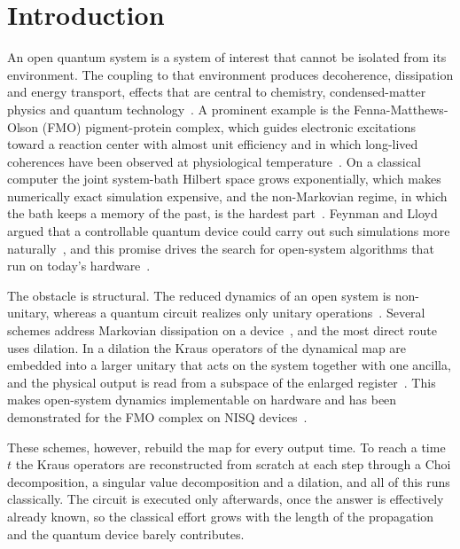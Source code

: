 \documentclass[aps,pra,twocolumn,superscriptaddress,nofootinbib,longbibliography]{revtex4-2}
\begin{document}
\maketitle

\section{Introduction}
\label{sec:intro}
An open quantum system is a system of interest that cannot be isolated from its
environment. The coupling to that environment produces decoherence, dissipation
and energy transport, effects that are central to chemistry, condensed-matter
physics and quantum technology~\cite{breuer2002}. A prominent example is the
Fenna-Matthews-Olson (FMO) pigment-protein complex, which guides electronic
excitations toward a reaction center with almost unit efficiency and in which
long-lived coherences have been observed at physiological
temperature~\cite{fenna1975,engel2007,ishizaki2009,adolphs2006}. On a classical
computer the joint system-bath Hilbert space grows exponentially, which makes
numerically exact simulation expensive, and the non-Markovian regime, in which
the bath keeps a memory of the past, is the hardest part~\cite{seneviratne2024}.
Feynman and Lloyd argued that a controllable quantum device could carry out such
simulations more naturally~\cite{feynman1982,lloyd1996}, and this promise drives
the search for open-system algorithms that run on today's
hardware~\cite{preskill2018}.

The obstacle is structural. The reduced dynamics of an open system is
non-unitary, whereas a quantum circuit realizes only unitary
operations~\cite{nielsen2010}. Several schemes address Markovian dissipation on
a device~\cite{sweke2015,kliesch2011,cleve2017,schlimgen2021}, and the most
direct route uses dilation. In a dilation the Kraus operators of the dynamical
map are embedded into a larger unitary that acts on the system together with one
ancilla, and the physical output is read from a subspace of the enlarged
register~\cite{hu2022,seneviratne2024}. This makes open-system dynamics
implementable on hardware and has been demonstrated for the FMO complex on NISQ
devices~\cite{hu2022,seneviratne2024,headmarsden2021}.

These schemes, however, rebuild the map for every output time. To reach a time
$t$ the Kraus operators are reconstructed from scratch at each step through a
Choi decomposition, a singular value decomposition and a dilation, and all of
this runs classically. The circuit is executed only afterwards, once the answer
is effectively already known, so the classical effort grows with the length of
the propagation and the quantum device barely contributes.
\end{document}
